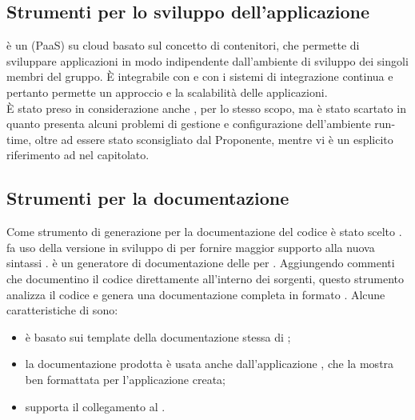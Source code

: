 \subsection{Strumenti per lo sviluppo dell'applicazione}
\textbf{} è un  (PaaS) su cloud basato sul concetto di contenitori, che permette di sviluppare applicazioni in modo indipendente dall'ambiente di sviluppo dei singoli membri del gruppo. \`{E} integrabile con  e con i sistemi di integrazione continua e pertanto permette un approccio  e la scalabilità delle applicazioni.\\
\`{E} stato preso in considerazione anche , per lo stesso scopo, ma è stato scartato in quanto presenta alcuni problemi di gestione e configurazione dell'ambiente run-time, oltre ad essere stato sconsigliato dal Proponente, mentre vi è un esplicito riferimento ad  nel capitolato.

\subsection{Strumenti per la documentazione}
Come strumento di generazione per la documentazione del codice è stato scelto \textbf{}.\\
 fa uso della versione in sviluppo di \textbf{} per fornire maggior supporto alla nuova sintassi .
 è un generatore di documentazione delle  per . Aggiungendo commenti che documentino il codice direttamente all'interno dei sorgenti, questo strumento analizza il codice e genera una documentazione completa in formato .
Alcune caratteristiche di  sono:
\begin{itemize}
	\item è basato sui template della documentazione stessa di ;
	\item la documentazione prodotta è usata anche dall'applicazione , che la mostra ben formattata per l'applicazione creata;
	\item supporta il collegamento al  .
\end{itemize}

